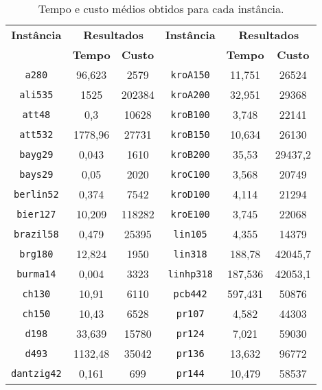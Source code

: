 \begin{table}[tp!]
\caption{Tempo e custo médios obtidos para cada instância.}
\label{tab:tabelaResultadosIlsTsp}
\centering
{
\setlength{\tabcolsep}{12pt}
\scriptsize
\centering
\begin{tabular}{cccccc}
\toprule
\multirow{2.5}{*}{\textbf{Instância}} & \multicolumn{2}{c}{\textbf{Resultados}} & \multirow{2.5}{*}{\textbf{Instância}} & \multicolumn{2}{c}{\textbf{Resultados}} \\
\cmidrule{2-3}\cmidrule{5-6}
& \textbf{Tempo} & \textbf{Custo} & & \textbf{Tempo}   & \textbf{Custo} \\ 
\midrule
\texttt{a280}      &  96,623   & 2579    & \texttt{kroA150}   & 11,751  & 26524   \\
\texttt{ali535}    &  1525     & 202384  & \texttt{kroA200}   & 32,951  & 29368   \\
\texttt{att48}     &  0,3      & 10628   & \texttt{kroB100}   & 3,748   & 22141   \\
\texttt{att532}    &  1778,96  & 27731   & \texttt{kroB150}   & 10,634  & 26130   \\
\texttt{bayg29}    &  0,043    & 1610    & \texttt{kroB200}   & 35,53   & 29437,2 \\
\texttt{bays29}    &  0,05     & 2020    & \texttt{kroC100}   & 3,568   & 20749   \\
\texttt{berlin52}  &  0,374    & 7542    & \texttt{kroD100}   & 4,114   & 21294   \\
\texttt{bier127}   &  10,209   & 118282  & \texttt{kroE100}   & 3,745   & 22068   \\
\texttt{brazil58}  &  0,479    & 25395   & \texttt{lin105}    & 4,355   & 14379   \\
\texttt{brg180}    &  12,824   & 1950    & \texttt{lin318}    & 188,78  & 42045,7 \\
\texttt{burma14}   &  0,004    & 3323    & \texttt{linhp318}  & 187,536 & 42053,1 \\
\texttt{ch130}     &  10,91    & 6110    & \texttt{pcb442}    & 597,431 & 50876   \\
\texttt{ch150}     &  10,43    & 6528    & \texttt{pr107}     & 4,582   & 44303   \\
\texttt{d198}      &  33,639   & 15780   & \texttt{pr124}     & 7,021   & 59030   \\
\texttt{d493}      &  1132,48  & 35042   & \texttt{pr136}     & 13,632  & 96772   \\
\texttt{dantzig42} &  0,161    & 699     & \texttt{pr144}     & 10,479  & 58537   \\

\end{tabular}}
\end{table}
